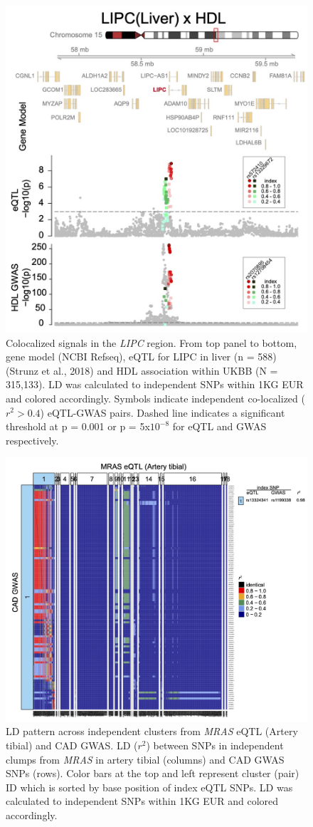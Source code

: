 \documentclass[11pt]{article}
\begin{document}
\begin{figure}[!ht]
  \centering
  \includegraphics[width=.7\textwidth]{figs/region_lipc.jpg}
  \caption{Colocalized signals in the \emph{LIPC} region. From top
    panel to bottom, gene model (NCBI Refseq), eQTL for LIPC in liver
    (n = 588) (Strunz et al., 2018) and HDL association within UKBB (N
    = 315,133). LD was calculated to independent SNPs within 1KG EUR
    and colored accordingly. Symbols indicate independent co-localized
    ($r^2> 0.4$) eQTL-GWAS pairs. Dashed line indicates a significant
    threshold at p = 0.001 or p = 5x$10^{-8}$ for eQTL and GWAS
    respectively.} 
\end{figure}

\begin{figure}[!ht]
  \centering
  \includegraphics[width=.7\textwidth]{figs/heatmap_mras.jpg}
  \caption{LD pattern across independent clusters from \emph{MRAS}
    eQTL (Artery tibial) and CAD GWAS. LD ($r^2$) between SNPs in
    independent clumps from \emph{MRAS} in artery tibial (columns) and
    CAD GWAS SNPs (rows). Color bars at the top and left represent
    cluster (pair) ID which is sorted by base position of index eQTL
    SNPs. LD was calculated to independent SNPs within 1KG EUR and
    colored accordingly.} 
\end{figure}
\end{document}
